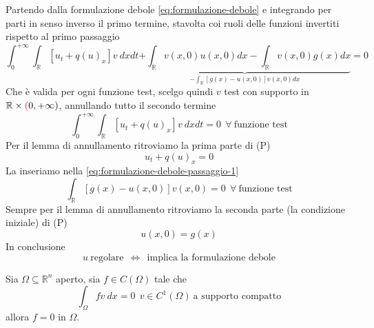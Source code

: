 \documentclass[10pt,a4paper,twoside,openright]{book}
\begin{document}
Partendo dalla formulazione debole \eqref{eq:formulazione-debole} e integrando per parti in senso inverso il primo termine, stavolta coi ruoli delle funzioni invertiti rispetto al primo passaggio
\begin{equation}
	\int ^{+\infty }_{0}\int _{\mathbb{R}}[ u_{t}+q( u)_{x}] v\ dxdt\underbrace{+\int _{\mathbb{R}} v( x,0) u( x,0) dx-\int _{\mathbb{R}} v( x,0) g( x) dx}_{-\int _{\mathbb{R}}[ g( x) -u( x,0)] v( x,0) dx} =0
\label{eq:formulazione-debole-passaggio-1}
\end{equation}
Che è valida per ogni funzione test, scelgo quindi $v$ test con supporto in $\mathbb{R} \times \textcolor[rgb]{0.82,0.01,0.11}{(} 0,+\infty )$, annullando tutto il secondo termine
\begin{equation*}
	\int ^{+\infty }_{0}\int _{\mathbb{R}}[ u_{t} +q( u)_{x}] v\ dxdt=0\ \ \forall \ \text{funzione test}
\end{equation*}
Per il lemma di annullamento ritroviamo la prima parte di (P)
\begin{equation*}
	u_{t} +q( u)_{x} =0
\end{equation*}
La inseriamo nella \eqref{eq:formulazione-debole-passaggio-1}
\begin{equation*}
	\int _{\mathbb{R}}[ g( x) -u( x,0)] v( x,0) =0\ \ \forall \ \text{funzione test}
\end{equation*}
Sempre per il lemma di annullamento ritroviamo la seconda parte (la condizione iniziale) di (P)
\begin{equation*}
	u( x,0) =g( x)
\end{equation*}
In conclusione
\begin{equation}
	u\ \text{regolare} \ \ \Leftrightarrow \ \ \text{implica la formulazione debole}
\end{equation}
\begin{theorem}
	 Sia $\Omega \subseteq \mathbb{R}^{n}$ aperto, sia $f\in C( \Omega )$ tale che
	\begin{equation}
		\int _{\Omega } fv\ dx=0\ \ v\in C^{1}( \Omega ) \ \text{a supporto compatto}
	\end{equation}
	allora $f=0$ in $\Omega $.
\end{theorem}
\end{document}
